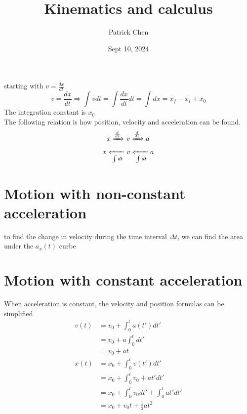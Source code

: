\documentclass{article}
\title{Kinematics and calculus}
\author{Patrick Chen}
\date{Sept 10, 2024}
\theoremstyle{mytheoremstyle}
\theoremstyle{mytheoremstyle}
\theoremstyle{myproblemstyle}
\begin{document}
    \maketitle
    starting with $v= \frac{dx}{dt}$
    \begin{equation*}
        v= \frac{dx}{dt} \Rightarrow \int v dt = \int \frac{dx}{dt} dt = \int dx = x_f-x_i + x_0
    \end{equation*}
    The integration constant is $x_0$ \\
    The following relation is how position, velocity and acceleration can be
    found.
    \begin{align*}
        x \xRightarrow{\frac{d}{dt}}&\ v \xRightarrow{\frac{d}{dt}} a \\
        x \xLeftarrow[\int dt]{}&\ v \xLeftarrow[\int dt]{} a
    \end{align*}

    \section*{Motion with non-constant acceleration}
    to find the change in velocity during the time interval $\Delta t$, we can find the area under the $a_x(t)$ curbe

    \section*{Motion with constant acceleration}
    When acceleration is constant, the velocity and position formulas can be simplified
    \begin{align*}
        v(t) &= v_0 + \int_0^t a(t') dt' \\
             &= v_0 + a\int_0^t dt' \\
             &= v_0 + at \\
        x(t) &= x_0 + \int_0^t v(t') dt' \\
             &= x_0 + \int_0^t v_0 + at' dt' \\
             &= x_0 + \int_0^t v_0 dt' + \int_0^t at' dt' \\
             &= x_0 + v_0t + \frac{1}{2} at^2
    \end{align*}
\end{document}
